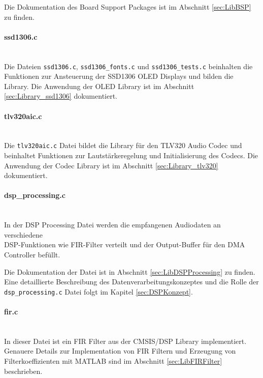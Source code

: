 Die Dokumentation des Board Support Packages ist im Abschnitt \ref{sec:LibBSP} zu finden.
\\
\paragraph{ssd1306.c}\vspace{-0.3cm}\\
Die Dateien \texttt{ssd1306.c}, \texttt{ssd1306\_fonts.c} und \texttt{ssd1306\_tests.c} beinhalten die Funktionen zur Ansteuerung der SSD1306 OLED Displays und bilden die Library.
Die Anwendung der OLED Library ist im Abschnitt \ref{sec:Library_ssd1306} dokumentiert.
\\
\paragraph{tlv320aic.c}\vspace{-0.3cm}\\
Die \texttt{tlv320aic.c} Datei bildet die Library für den TLV320 Audio Codec und beinhaltet Funktionen zur Lautstärkeregelung und Initialisierung des Codecs.
Die Anwendung der Codec Library ist im Abschnitt \ref{sec:Library_tlv320} dokumentiert.
\\
\paragraph{dsp\_processing.c}\vspace{-0.3cm}\\
In der DSP Processing Datei werden die empfangenen Audiodaten an verschiedene \\
DSP-Funktionen wie FIR-Filter verteilt und der Output-Buffer für den DMA Controller befüllt.

Die Dokumentation der Datei ist in Abschnitt \ref{sec:LibDSPProcessing} zu finden.
Eine detaillierte Beschreibung des Datenverarbeitungskonzeptes und die Rolle der \texttt{dsp\_processing.c} Datei folgt im Kapitel \ref{sec:DSPKonzept}.
\\
\paragraph{fir.c}\vspace{-0.3cm}\\
In dieser Datei ist ein FIR Filter aus der CMSIS/DSP Library implementiert.
Genauere Details zur Implementation von FIR Filtern und Erzeugung von Filterkoeffizienten mit MATLAB sind im Abschnitt \ref{sec:LibFIRFilter} beschrieben.
\\
